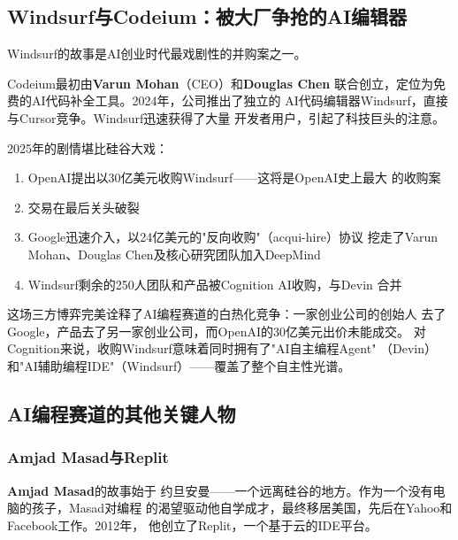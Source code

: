 \subsection{Windsurf与Codeium：被大厂争抢的AI编辑器}
\label{subsec:founders-windsurf}

Windsurf的故事是AI创业时代最戏剧性的并购案之一。

Codeium最初由\textbf{Varun Mohan}（CEO）和\textbf{Douglas Chen}
联合创立，定位为免费的AI代码补全工具。2024年，公司推出了独立的
AI代码编辑器Windsurf，直接与Cursor竞争。Windsurf迅速获得了大量
开发者用户，引起了科技巨头的注意。

2025年的剧情堪比硅谷大戏：

\begin{enumerate}
  \item OpenAI提出以30亿美元收购Windsurf——这将是OpenAI史上最大
    的收购案
  \item 交易在最后关头破裂
  \item Google迅速介入，以24亿美元的"反向收购"（acqui-hire）协议
    挖走了Varun Mohan、Douglas Chen及核心研究团队加入DeepMind
  \item Windsurf剩余的250人团队和产品被Cognition AI收购，与Devin
    合并
\end{enumerate}

这场三方博弈完美诠释了AI编程赛道的白热化竞争：一家创业公司的创始人
去了Google，产品去了另一家创业公司，而OpenAI的30亿美元出价未能成交。
对Cognition来说，收购Windsurf意味着同时拥有了"AI自主编程Agent"
（Devin）和"AI辅助编程IDE"（Windsurf）——覆盖了整个自主性光谱。

\subsection{AI编程赛道的其他关键人物}
\label{subsec:founders-coding-others}

\subsubsection{Amjad Masad与Replit} \textbf{Amjad Masad}的故事始于
约旦安曼——一个远离硅谷的地方。作为一个没有电脑的孩子，Masad对编程
的渴望驱动他自学成才，最终移居美国，先后在Yahoo和Facebook工作。2012年，
他创立了Replit，一个基于云的IDE平台。

